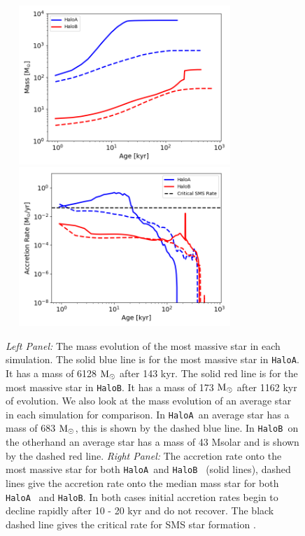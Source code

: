 \documentclass[graphics, twocolumn, usenatbib]{mn2e}
\newcommand{\msolar} {$\rm{M_{\odot}}~$}
\newcommand{\msolarc} {$\rm{M_{\odot}}$}
\newcommand{\ha} {\texttt{HaloA~}}
\newcommand{\hb} {\texttt{HaloB~}}
\newcommand{\hbc} {\texttt{HaloB}}
\begin{document}

\begin{figure}
\centering
\begin{minipage}{175mm}      \begin{center}
    \centerline{
      \includegraphics[width=9.0cm, height=6cm]{FIGURES/Mass_MultipleHaloes.png}
      \includegraphics[width=9.0cm, height=6cm]{FIGURES/MassAccretionRate_MultipleHaloes.png}}
    \caption{
      \textit{Left Panel:} The mass evolution of the most massive star in each simulation. The
      solid blue line is for the most massive star in \texttt{HaloA}. It has a mass of 6128 \msolar after 143 kyr.
      The solid red line is for the most massive star in \texttt{HaloB}. It has a mass of 173 \msolar after 1162 kyr
      of evolution. We also look at the mass evolution of an average star in each simulation for
      comparison. In \ha an average star has a mass of 683 \msolarc, this is shown by the dashed blue line.
      In \hb on the otherhand an average star has a mass of 43 Msolar and is shown by the dashed red line.
      \textit{Right Panel:} The accretion rate onto the most massive star for both \ha and \hb
      (solid lines), dashed lines give the accretion rate onto the median mass star for both \ha
      and \hbc. In both cases initial accretion rates begin to decline rapidly after 10 - 20 kyr and
      do not recover. The black dashed line gives the critical rate for SMS star formation
      \citep{Sakurai_2016}.
    }
\label{Fig:AccretionRates}
\end{center} \end{minipage}
\end{figure}
\end{document}
